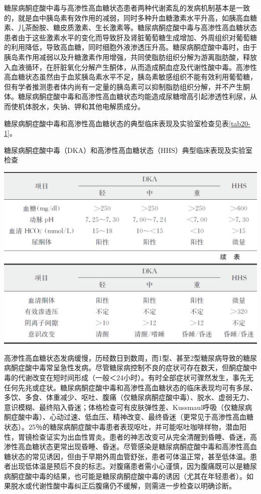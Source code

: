 糖尿病酮症酸中毒与高渗性高血糖状态患者两种代谢紊乱的发病机制基本是一致的，就是血中胰岛素有效作用的减弱，同时多种升血糖激素水平升高，如胰高血糖素、儿茶酚胺、糖皮质激素、生长激素等。糖尿病酮症酸中毒与高渗性高血糖状态患者由于这些激素水平的变化而导致肝及肾脏葡萄糖生成增加、外周组织对葡萄糖的利用降低，导致高血糖，同时细胞外液渗透压升高。糖尿病酮症酸中毒时，由于胰岛素作用减弱以及升糖激素作用增强，共同使脂肪组织分解为游离脂肪酸，释放入血液循环，在肝脏氧化分解产生酮体，从而造成酮血症及代谢性酸中毒。高渗性高血糖状态虽然由于血浆胰岛素水平不足，胰岛素敏感组织不能有效利用葡萄糖，但有学者推测患者体内尚有一定量的胰岛素可以抑制脂肪组织分解，并不产生酮体。糖尿病酮症酸中毒和高渗性高血糖状态均能造成尿糖增高引起渗透性利尿，从而使机体脱水，失钠、钾和其他电解质成分。

糖尿病酮症酸中毒和高渗性高血糖状态的典型临床表现及实验室检查见表\ref{tab20-1}。

\begin{table}[htbp]
\centering
\caption{糖尿病酮症酸中毒（DKA）和高渗性高血糖状态（HHS）典型临床表现及实验室检查}
\label{tab20-1}
\includegraphics{./images/Image00197.jpg}
\includegraphics{./images/Image00198.jpg}
\end{table}

高渗性高血糖状态发病缓慢，历经数日到数周，而1型、甚至2型糖尿病导致的糖尿病酮症酸中毒常呈急性发病。尽管糖尿病控制不良的症状可存在数天，但酮症酸中毒的代谢改变在短时间形成（一般＜24小时）。有时全部症状可骤然发生，事先无任何先兆或症状。糖尿病酮症酸中毒和高渗性高血糖状态的临床表现均可有多尿、多饮、多食、体重减少、呕吐、腹痛（仅糖尿病酮症酸中毒）、脱水、虚弱无力、意识模糊、最终陷入昏迷；体格检查可有皮肤弹性差、Kussmaul呼吸（仅糖尿病酮症酸中毒）、心动过速、低血压、精神改变、最终昏迷（更常见于高渗性高血糖状态）。25％的糖尿病酮症酸中毒患者表现呕吐，并可能呕吐咖啡样物，潜血阳性，胃镜检查证实为出血性胃炎。患者的神志改变可从完全清醒到昏睡、昏迷，高渗性高血糖状态更常出现昏睡、昏迷。尽管感染是糖尿病酮症酸中毒和高渗性高血糖状态的常见诱因，但由于早期外周血管舒张，患者可体温正常，甚至低体温。患者出现低体温是预后不良的标志。对腹痛患者需小心谨慎，因为腹痛既可以是糖尿病酮症酸中毒的结果，也可能是糖尿病酮症酸中毒的诱因（尤其在年轻患者）。如果脱水或代谢性酸中毒纠正后腹痛仍不缓解，则需进一步检查以明确诊断。


